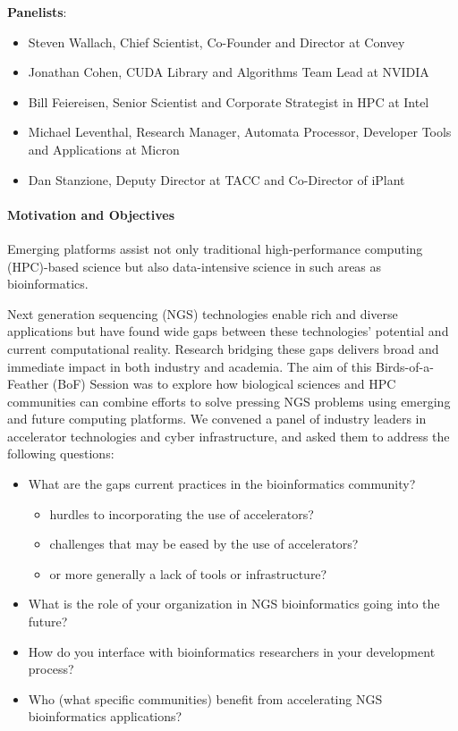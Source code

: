 \textbf{Panelists}: 
\begin{itemize}
\item[]	Steven Wallach, Chief Scientist, Co-Founder and Director at Convey
\item[]	Jonathan Cohen,  CUDA Library and Algorithms Team Lead at NVIDIA
\item[]	Bill Feiereisen, Senior Scientist and Corporate Strategist in HPC at Intel
\item[]	Michael Leventhal, Research Manager, Automata Processor, Developer Tools and Applications at Micron
\item[]	Dan Stanzione, Deputy Director at TACC and Co-Director of iPlant
\end{itemize}


\paragraph{Motivation and Objectives}
Emerging platforms assist not only traditional high-performance computing (HPC)-based science but also data-intensive science in such areas as bioinformatics. 



Next generation sequencing (NGS) technologies enable rich and diverse applications but have found wide gaps between these technologies' potential and current computational reality. Research bridging these gaps delivers broad and immediate impact in both industry and academia. The aim of this Birds-of-a-Feather (BoF) Session was to explore how biological sciences and HPC communities can combine efforts to solve pressing NGS problems using emerging and future computing platforms. We convened a panel of industry leaders in accelerator technologies and cyber infrastructure, and asked them to address the following questions:
\begin{itemize}
\item	What are the gaps current practices in the bioinformatics community?
\begin{itemize}
\item	hurdles to incorporating the use of accelerators?
\item	challenges that may be eased by the use of accelerators?
\item	or more generally a lack of tools or infrastructure?
\end{itemize}
\item	What is the role of your organization in NGS bioinformatics going into the future?
\item	How do you interface with bioinformatics researchers in your development process?
\item	Who (what specific communities) benefit from accelerating NGS bioinformatics applications?
\end{itemize}

